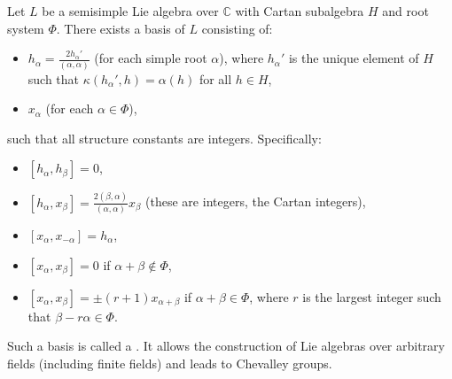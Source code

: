Let $L$ be a semisimple Lie algebra over $\mathbb{C}$ with Cartan subalgebra $H$ and root system $\Phi$. There exists a basis of $L$ consisting of:
\begin{itemize}
\item $h_\alpha = \frac{2h_\alpha'}{(\alpha, \alpha)}$ (for each simple root $\alpha$), where $h_\alpha'$ is the unique element of $H$ such that $\kappa(h_\alpha', h) = \alpha(h)$ for all $h \in H$,
\item $x_\alpha$ (for each $\alpha \in \Phi$),
\end{itemize}
such that all structure constants are integers. Specifically:
\begin{itemize}
\item $[h_\alpha, h_\beta] = 0$,
\item $[h_\alpha, x_\beta] = \frac{2(\beta, \alpha)}{(\alpha, \alpha)} x_\beta$ (these are integers, the Cartan integers),
\item $[x_\alpha, x_{-\alpha}] = h_\alpha$,
\item $[x_\alpha, x_\beta] = 0$ if $\alpha + \beta \notin \Phi$,
\item $[x_\alpha, x_\beta] = \pm (r+1) x_{\alpha+\beta}$ if $\alpha + \beta \in \Phi$, where $r$ is the largest integer such that $\beta - r\alpha \in \Phi$.
\end{itemize}
Such a basis is called a . It allows the construction of Lie algebras over arbitrary fields (including finite fields) and leads to Chevalley groups.
